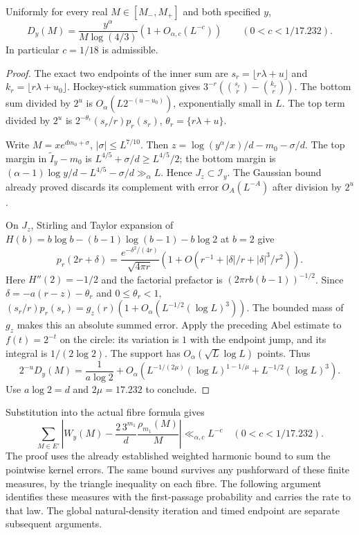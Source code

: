 \begin{proposition}
\label{prop:Allikvere-leading-kernel}
Uniformly for every real $M\in[M_-,M_+]$ and both specified $y$,
\[
 D_y(M)=\frac{y^\alpha}{M\log(4/3)}
          (1+O_{\alpha,c}(L^{-c}))
 \qquad(0<c<1/17.232).
\]
In particular $c=1/18$ is admissible.
\end{proposition}
\begin{proof}
The exact two endpoints of the inner sum are
$s_r=\lfloor r\lambda+u\rfloor$ and
$k_r=\lfloor r\lambda+u_0\rfloor$.
Hockey-stick summation gives
$3^{-r}(\binom{s_r}{r}-\binom{k_r}{r})$.
The bottom sum divided by $2^u$ is
$O_\alpha(L2^{-(u-u_0)})$, exponentially small in $L$.
The top term divided by $2^u$ is
$2^{-\theta_r}(s_r/r)p_r(s_r)$, $\theta_r=\{r\lambda+u\}$.

Write $M=xe^{dm_0+\sigma}$, $|\sigma|\le L^{7/10}$. Then
$z=\log(y^\alpha/x)/d-m_0-\sigma/d$.
The top margin in $\widetilde I_y-m_0$ is
$L^{4/5}+\sigma/d\ge L^{4/5}/2$; the bottom margin is
$(\alpha-1)\log y/d-L^{4/5}-\sigma/d\gg_\alpha L$.
Hence $J_z\subset\mathcal I_y$. The Gaussian bound already proved
discards its complement with error $O_A(L^{-A})$ after division by $2^u$.

On $J_z$, Stirling and Taylor expansion of
$H(b)=b\log b-(b-1)\log(b-1)-b\log2$ at $b=2$ give
\[
 p_r(2r+\delta)=\frac{e^{-\delta^2/(4r)}}{\sqrt{4\pi r}}
 (1+O(r^{-1}+|\delta|/r+|\delta|^3/r^2)).
\]
Here $H''(2)=-1/2$ and the factorial prefactor is
$(2\pi r b(b-1))^{-1/2}$.
Since $\delta=-a(r-z)-\theta_r$ and $0\le\theta_r<1$,
$(s_r/r)p_r(s_r)=g_z(r)(1+O_\alpha(L^{-1/2}(\log L)^3))$.
The bounded mass of $g_z$ makes this an absolute summed error.
Apply the preceding Abel estimate to $f(t)=2^{-t}$ on the circle:
its variation is $1$ with the endpoint jump, and its integral is
$1/(2\log2)$. The support has $O_\alpha(\sqrt L\log L)$ points.
Thus
\[
 2^{-u}D_y(M)=\frac1{a\log2}
 +O_\alpha(L^{-1/(2\mu)}(\log L)^{1-1/\mu}
                   +L^{-1/2}(\log L)^3).
\]
Use $a\log2=d$ and $2\mu=17.232$ to conclude.
\end{proof}

Substitution into the actual fibre formula gives
\[
 \sum_{M\in E'}\left|W_y(M)
  -\frac{2\,3^{m_1}}{d}\frac{\rho_{m_1}(M)}M\right|
  \ll_{\alpha,c}L^{-c}\quad(0<c<1/17.232).
\]
The proof uses the already established weighted harmonic bound to sum
the pointwise kernel errors. The same bound survives any pushforward
of these finite measures, by the triangle inequality on each fibre.
The following argument identifies these measures with the first-passage
probability and carries the rate to that law. The global natural-density
iteration and timed endpoint are separate subsequent arguments.

